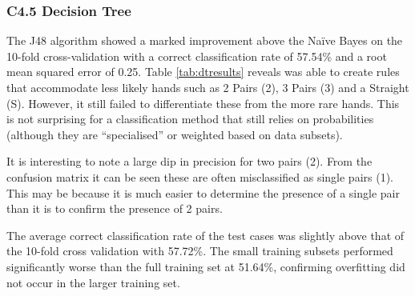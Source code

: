 \documentclass[10pt, a4paper]{article}
\begin{document}
\subsubsection*{C4.5 Decision Tree}

The J48 algorithm showed a marked improvement above the Na\"ive Bayes on the 10-fold cross-validation with a correct classification rate of 57.54\% and a root mean squared error of 0.25. Table \ref{tab:dtresults} reveals was able to create rules that accommodate less likely hands such as 2 Pairs (2), 3 Pairs (3) and a Straight (S). However, it still failed to differentiate these from the more rare hands. This is not surprising for a classification method that still relies on probabilities (although they are ``specialised'' or weighted based on data subsets). 

It is interesting to note a large dip in precision for two pairs (2). From the confusion matrix it can be seen these are often misclassified as single pairs (1). This may be because it is much easier to determine the presence of a single pair than it is to confirm the presence of 2 pairs.

The average correct classification rate of the test cases was slightly above that of the 10-fold cross validation with 57.72\%. The small training subsets performed significantly worse than the full training set at 51.64\%, confirming overfitting did not occur in the larger training set.
\end{document}
